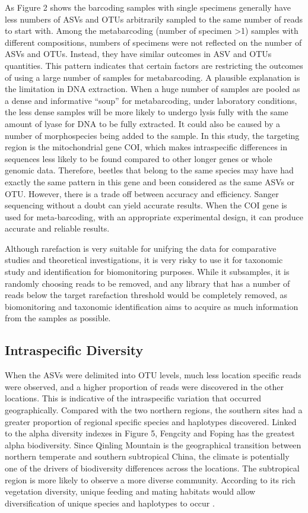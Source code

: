 \documentclass[11pt, a4paper]{article}
\begin{document}
As Figure 2 shows the barcoding samples with single specimens generally have less numbers of ASVs and OTUs arbitrarily sampled to the same number of reads to start with. Among the metabarcoding (number of specimen >1) samples with different compositions, numbers of specimens were not reflected on the number of ASVs and OTUs. Instead, they have similar outcomes in ASV and OTUs quantities. This pattern indicates that certain factors are restricting the outcomes of using a large number of samples for metabarcoding. A plausible explanation is the limitation in DNA extraction. When a huge number of samples are pooled as a dense and informative “soup” for metabarcoding, under laboratory conditions, the less dense samples will be more likely to undergo lysis fully with the same amount of lyase for DNA to be fully extracted. It could also be caused by a number of morphospecies being added to the sample. In this study, the targeting region is the mitochondrial gene COI, which makes  intraspecific differences in sequences less likely to be found compared to other longer genes or whole genomic data. Therefore, beetles that belong to the same species may have had exactly the same pattern in this gene and been considered as the same ASVs or OTU. However, there is a trade off between accuracy and efficiency. Sanger sequencing without a doubt can yield accurate results. When the COI gene is used for meta-barcoding, with an appropriate experimental design, it can produce accurate and reliable results.

Although rarefaction is very suitable for  unifying the data for comparative studies and theoretical investigations\cite{Melian2011}, it is very risky to use it for taxonomic study and identification for biomonitoring purposes. While it subsamples, it is randomly choosing reads to be removed, and any library that has a number of reads below the target rarefaction threshold would be completely removed, as biomonitoring and taxonomic identification aims to acquire as much information from the samples as possible.

\subsection{Intraspecific Diversity}
When the ASVs were delimited into OTU levels, much less location specific reads were observed, and a higher proportion of reads were discovered in the other locations. This is indicative of the intraspecific variation that occurred geographically. Compared with the two northern regions, the southern sites had a greater proportion of regional specific species and haplotypes discovered. 
Linked to the alpha diversity indexes in Figure 5, Fengcity and Foping has the greatest alpha biodiversity. Since Qinling Mountain is the geographical transition between northern temperate and southern subtropical China, the climate is potentially one of the drivers of biodiversity differences across the locations. The subtropical region is more likely to observe a more diverse community. According to its rich vegetation diversity, unique feeding and mating habitats would allow diversification of unique species and haplotypes to occur \cite{Deyrup1987}. 
\end{document}
